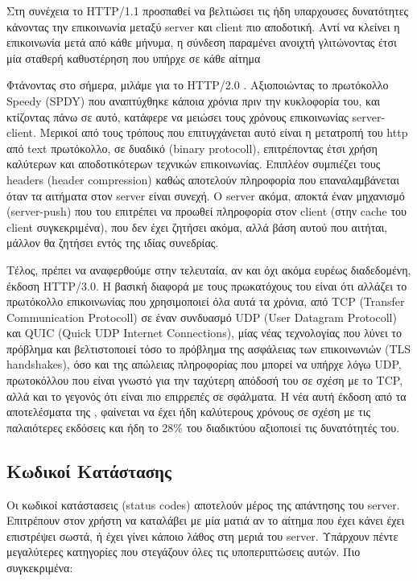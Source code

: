 Στη συνέχεια το HTTP/1.1 προσπαθεί να βελτιώσει τις ήδη υπαρχουσες δυνατότητες κάνοντας την επικοινωνία
μεταξύ server και client πιο αποδοτική. Αντί να κλείνει η επικοινωνία μετά από κάθε μήνυμα, η σύνδεση παραμένει
ανοιχτή γλιτώνοντας έτσι μία σταθερή καθυστέρηση που υπήρχε σε κάθε αίτημα

Φτάνοντας στο σήμερα, μιλάμε για το HTTP/2.0 \cite{http2}. Αξιοποιώντας το πρωτόκολλο Speedy (SPDY) που αναπτύχθηκε κάποια χρόνια πριν
την κυκλοφορία του, και κτίζοντας πάνω σε αυτό, κατάφερε να μειώσει τους χρόνους επικοινωνίας server-client.
Μερικοί από τους τρόπους που επιτυγχάνεται αυτό είναι η μετατροπή του http από text πρωτόκολλο, σε δυαδικό (binary protocoll), επιτρέποντας έτσι χρήση καλύτερων
και αποδοτικότερων τεχνικών επικοινωνίας. Επιπλέον συμπιέζει τους headers (header compression) καθώς αποτελούν πληροφορία που
επαναλαμβάνεται όταν τα αιτήματα στον server είναι συνεχή. Ο server ακόμα, αποκτά έναν μηχανισμό (server-push) που του
επιτρέπει να προωθεί πληροφορία στον client (στην cache του client συγκεκριμένα), που δεν έχει ζητήσει ακόμα, αλλά βάση αυτού
που αιτήται, μάλλον θα ζητήσει εντός της ιδίας συνεδρίας.

Τέλος, πρέπει να αναφερθούμε στην τελευταία, αν και όχι ακόμα ευρέως διαδεδομένη, έκδοση HTTP/3.0. H βασική διαφορά με τους
πρωκατόχους του είναι ότι αλλάζει το πρωτόκολλο επικοινωνίας που χρησιμοποιεί όλα αυτά τα χρόνια, από TCP (Transfer Communication Protocoll) σε
έναν συνδυασμό UDP (User Datagram Protocoll) και QUIC (Quick UDP Internet Connections), μίας νέας τεχνολογίας που λύνει το πρόβλημα και βελτιστοποιεί τόσο το πρόβλημα 
της ασφάλειας των επικοινωνιών (TLS handshakes), όσο και της απώλειας πληροφορίας που μπορεί να υπήρχε λόγω UDP, πρωτοκόλλου που είναι γνωστό
για την ταχύτερη απόδοσή του σε σχέση με το TCP, αλλά και το γεγονός ότι είναι πιο επιρρεπές σε σφάλματα. Η νέα αυτή έκδοση από τα αποτελέσματα 
της \cite{http3}, φαίνεται να έχει ήδη καλύτερους χρόνους σε σχέση με τις παλαιότερες εκδόσεις και ήδη το 28\% του διαδικτύου αξιοποιεί τις δυνατότητές του. 


\subsection{Κωδικοί Κατάστασης}
\label{subsec:http_status_codes}

Οι κωδικοί κατάστασεις (status codes) αποτελούν μέρος της απάντησης του server. Επιτρέπουν στον χρήστη να καταλάβει με μία ματιά αν το αίτημα που έχει κάνει έχει επιστρέψει σωστά, ή έχει γίνει κάποιο λάθος στη μεριά του server.
Υπάρχουν πέντε μεγαλύτερες κατηγορίες που στεγάζουν όλες τις υποπεριπτώσεις αυτών. Πιο συγκεκριμένα:

